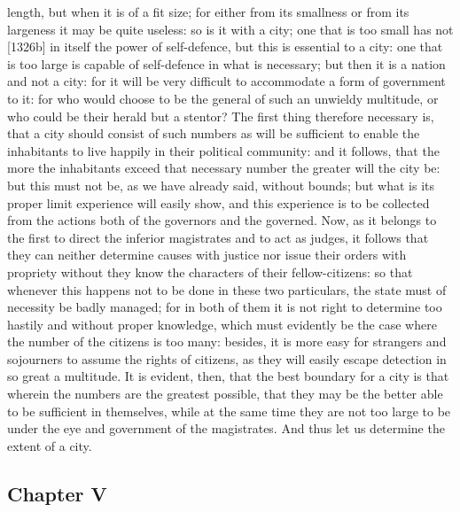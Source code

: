 \documentclass[12pt]{article}
\begin{document}
length, but when it is of a fit size; for either from its smallness or from its largeness it may be quite useless: so is it with a city; one that is too small has not [1326b] in itself the power of self-defence, but this is essential to a city: one that is too large is capable of self-defence in what is necessary; but then it is a nation and not a city: for it will be very difficult to accommodate a form of government to it: for who would choose to be the general of such an unwieldy multitude, or who could be their herald but a stentor? The first thing therefore necessary is, that a city should consist of such numbers as will be sufficient to enable the inhabitants to live happily in their political community: and it follows, that the more the inhabitants exceed that necessary number the greater will the city be: but this must not be, as we have already said, without bounds; but what is its proper limit experience will easily show, and this experience is to be collected from the actions both of the governors and the governed. Now, as it belongs to the first to direct the inferior magistrates and to act as judges, it follows that they can neither determine causes with justice nor issue their orders with propriety without they know the characters of their fellow-citizens: so that whenever this happens not to be done in these two particulars, the state must of necessity be badly managed; for in both of them it is not right to determine too hastily and without proper knowledge, which must evidently be the case where the number of the citizens is too many: besides, it is more easy for strangers and sojourners to assume the rights of citizens, as they will easily escape detection in so great a multitude. It is evident, then, that the best boundary for a city is that wherein the numbers are the greatest possible, that they may be the better able to be sufficient in themselves, while at the same time they are not too large to be under the eye and government of the magistrates. And thus let us determine the extent of a city.

\subsection*{Chapter V}
\end{document}

